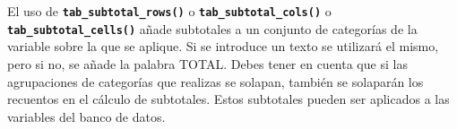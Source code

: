 \documentclass[
]{book}
\newenvironment{Shaded}{\begin{snugshade}}{\end{snugshade}}
\newcommand{\AttributeTok}[1]{\textcolor[rgb]{0.77,0.63,0.00}{#1}}
\newcommand{\DecValTok}[1]{\textcolor[rgb]{0.00,0.00,0.81}{#1}}
\newcommand{\FunctionTok}[1]{\textcolor[rgb]{0.00,0.00,0.00}{#1}}
\newcommand{\NormalTok}[1]{#1}
\newcommand{\OtherTok}[1]{\textcolor[rgb]{0.56,0.35,0.01}{#1}}
\newcommand{\SpecialCharTok}[1]{\textcolor[rgb]{0.00,0.00,0.00}{#1}}
\newcommand{\StringTok}[1]{\textcolor[rgb]{0.31,0.60,0.02}{#1}}
\begin{document}
El uso de \textbf{\texttt{tab\_subtotal\_rows()}} o \textbf{\texttt{tab\_subtotal\_cols()}} o \textbf{\texttt{tab\_subtotal\_cells()}} añade subtotales a un conjunto de categorías de la variable sobre la que se aplique. Si se introduce un texto se utilizará el mismo, pero si no, se añade la palabra TOTAL. Debes tener en cuenta que si las agrupaciones de categorías que realizas se solapan, también se solaparán los recuentos en el cálculo de subtotales. Estos subtotales pueden ser aplicados a las variables del banco de datos.

\begin{Shaded}
\end{Shaded}
\end{document}
